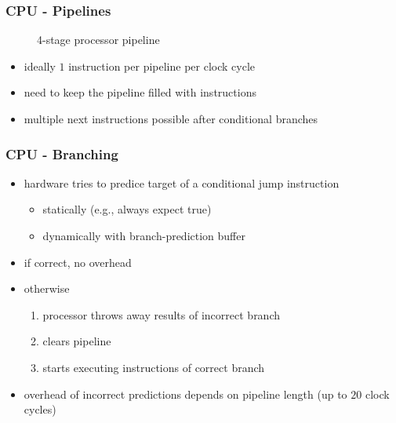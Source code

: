\begin{frame}
 \frametitle{CPU - Pipelines}

 \begin{figure}
  \caption{4-stage processor pipeline}
 \end{figure}

 \begin{itemize}
  \item ideally \( 1 \) instruction per pipeline per clock cycle
  \item need to keep the pipeline filled with instructions
  \item multiple next instructions possible after conditional branches
 \end{itemize}
\end{frame}

\begin{frame}
 \frametitle{CPU - Branching}
 \begin{itemize}
  \item hardware tries to predice target of a conditional jump instruction
   \begin{itemize}
    \item statically (e.g., always expect true)
    \item dynamically with branch-prediction buffer
   \end{itemize}
  \item if correct, no overhead
  \item otherwise
  \begin{enumerate}
   \item processor throws away results of incorrect branch
   \item clears pipeline
   \item starts executing instructions of correct branch
  \end{enumerate}
  \item overhead of incorrect predictions depends on pipeline length (up to \( 20 \) clock cycles)
 \end{itemize}
\end{frame}

